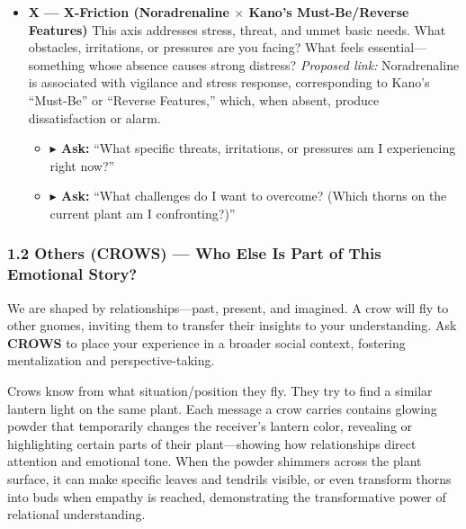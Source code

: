 \documentclass{article}
\begin{document}
\begin{itemize}[noitemsep,topsep=0pt]
    \item \textbf{X — X-Friction (Noradrenaline $\times$ Kano’s Must-Be/Reverse Features)}  
    This axis addresses stress, threat, and unmet basic needs. What obstacles, irritations, or pressures are you facing? What feels essential—something whose absence causes strong distress?  
    \textit{Proposed link:} Noradrenaline is associated with vigilance and stress response, corresponding to Kano’s “Must-Be” or “Reverse Features,” which, when absent, produce dissatisfaction or alarm.  
    \begin{itemize}[noitemsep,topsep=0pt]
        \item \textbf{$\blacktriangleright$ Ask:} “What specific threats, irritations, or pressures am I experiencing right now?”  
        \item \textbf{$\blacktriangleright$ Ask:} “What challenges do I want to overcome? (Which thorns on the current plant am I confronting?)”  
    \end{itemize}

\end{itemize}



\subsubsection{1.2 Others (CROWS) — Who Else Is Part of This Emotional Story?}
We are shaped by relationships—past, present, and imagined. A crow will fly to other gnomes, inviting them to transfer their insights to your understanding. Ask \textbf{CROWS} to place your experience in a broader social context, fostering mentalization and perspective-taking.

Crows know from what situation/position they fly. They try to find a similar lantern light on the same plant. Each message a crow carries contains glowing powder that temporarily changes the receiver's lantern color, revealing or highlighting certain parts of their plant—showing how relationships direct attention and emotional tone. When the powder shimmers across the plant surface, it can make specific leaves and tendrils visible, or even transform thorns into buds when empathy is reached, demonstrating the transformative power of relational understanding.
\end{document}
